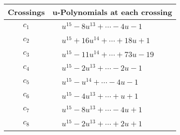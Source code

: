 \documentclass[1p]{elsarticle_modified}
\theoremstyle{definition}
\begin{document}
\begin{tabular}{m{50pt}|m{274pt}}
Crossings & \hspace{64pt}u-Polynomials at each crossing \\
\hline $$\begin{aligned}c_{1}\end{aligned}$$&$\begin{aligned}
&u^{15}-8 u^{13}+\cdots-4 u-1
\end{aligned}$\\
\hline $$\begin{aligned}c_{2}\end{aligned}$$&$\begin{aligned}
&u^{15}+16 u^{14}+\cdots+18 u+1
\end{aligned}$\\
\hline $$\begin{aligned}c_{3}\end{aligned}$$&$\begin{aligned}
&u^{15}-11 u^{14}+\cdots+73 u-19
\end{aligned}$\\
\hline $$\begin{aligned}c_{4}\end{aligned}$$&$\begin{aligned}
&u^{15}-2 u^{13}+\cdots-2 u-1
\end{aligned}$\\
\hline $$\begin{aligned}c_{5}\end{aligned}$$&$\begin{aligned}
&u^{15}- u^{14}+\cdots-4 u-1
\end{aligned}$\\
\hline $$\begin{aligned}c_{6}\end{aligned}$$&$\begin{aligned}
&u^{15}-4 u^{13}+\cdots+u+1
\end{aligned}$\\
\hline $$\begin{aligned}c_{7}\end{aligned}$$&$\begin{aligned}
&u^{15}-8 u^{13}+\cdots-4 u+1
\end{aligned}$\\
\hline $$\begin{aligned}c_{8}\end{aligned}$$&$\begin{aligned}
&u^{15}-2 u^{13}+\cdots+2 u+1
\end{aligned}$\\

\end{tabular}
\end{document}
